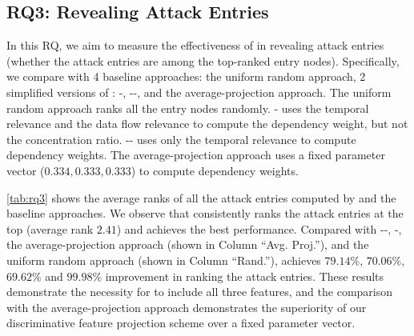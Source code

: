 
%




\subsection{RQ3: Revealing Attack Entries}
\label{subsec:rq3}

In this RQ, we aim to measure the effectiveness of \tool in revealing attack entries (\ie whether the attack entries are among the top-ranked entry nodes).
Specifically, we compare \tool with 4 baseline approaches: the uniform random approach, 2 simplified versions of \tool: \tool-, \tool-{}-, and the average-projection approach.
The uniform random approach ranks all the entry nodes randomly.
\tool- uses the temporal relevance and the data flow relevance to compute the dependency weight, but not the concentration ratio.
\tool-{}- uses only the temporal relevance to compute dependency weights.
The average-projection approach uses a fixed parameter vector ($0.334, 0.333, 0.333$) to compute dependency weights.



\cref{tab:rq3} shows the average ranks of all the attack entries computed by \tool and the baseline approaches.
We observe that \tool consistently ranks the attack entries at the top (average rank $2.41$) and achieves the best performance.
%
Compared with \tool-{}-, \tool-, the average-projection approach (shown in Column ``Avg. Proj.''), and the uniform random approach (shown in Column ``Rand.''), \tool achieves $79.14\%$, $70.06\%$, $69.62\%$ and $99.98\%$ improvement in ranking the attack entries.
These results demonstrate the necessity for \tool to include all three features, 
and the comparison with the average-projection approach demonstrates the superiority of our discriminative feature projection scheme over a fixed parameter vector.



